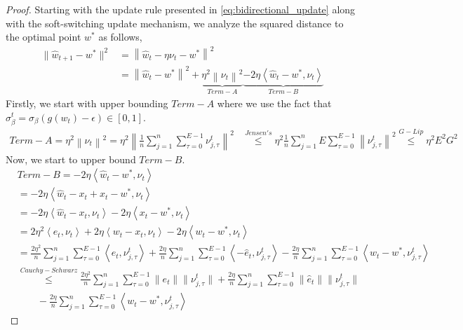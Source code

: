 \documentclass{article} %
\begin{document}
\begin{proof}
    Starting with the update rule presented in \cref{eq:bidirectional_update} along with the soft-switching update mechanism, we analyze the squared distance to the optimal point $w^*$ as follows,
    \begin{align}
    \nonumber
    \|\hat{w}_{t+1} - w^*\|^2 
    &= \left\| \hat{w}_t - \eta \nu_t - w^* \right\|^2 \\
    \label{eq:soft_fedbi_start}
    & = \left\| \hat{w}_t - w^* \right\|^2 + \underbrace{\eta^2\left\|\nu_t \right\|^2}_{Term-A} \underbrace{-2 \eta \left \langle\hat{w}_t - w^*,  \nu_t \right \rangle}_{Term-B}
\end{align}
Firstly, we start with upper bounding $Term-A$ where we use the fact that $\sigma_\beta^t =\sigma_\beta(g(w_t) - \epsilon) \in [0,1]$.
\begin{align*}
    Term-A = \eta^2\left\|\nu_t \right\|^2 = \eta^2 \left\| \frac{1}{n} \sum_{j=1}^n  \sum_{\tau=0}^{E-1} \nu_{j,\tau}^t\right\|^2 &\overset{Jensen's}{\leq} \eta^2 \frac{1}{n} \sum_{j=1}^n E \sum_{\tau=0}^{E-1}\left\|  \nu_{j,\tau}^t\right\|^2 \overset{G-Lip}{\leq} \eta^2 E^2 G^2
\end{align*}
Now, we start to upper bound $Term-B$.
\begin{align*}
    &Term-B = -2 \eta \left \langle\hat{w}_t - w^*,  \nu_t \right \rangle 
    \\
    &= -2 \eta \left \langle\hat{w}_t - x_t + x_t - w^*,  \nu_t \right \rangle
    \\
    & = -2 \eta \left \langle\hat{w}_t - x_t,  \nu_t \right \rangle -2 \eta \left \langle x_t - w^*,  \nu_t \right \rangle 
    \\
    & = 2 \eta^2 \left \langle e_t,  \nu_t \right \rangle + 2 \eta \left \langle w_t - x_t,  \nu_t \right \rangle -2\eta \left \langle w_t - w^*,  \nu_t \right \rangle
    \\
    &= \frac{2 \eta^2 }{n} \sum_{j=1}^n  \sum_{\tau=0}^{E-1} \left \langle e_t,  \nu_{j,\tau}^t  \right \rangle +  \frac{2 \eta}{n} \sum_{j=1}^n  \sum_{\tau=0}^{E-1}\left \langle -\hat{e}_t,  \nu_{j,\tau}^t \right \rangle - \frac{2 \eta}{n} \sum_{j=1}^n  \sum_{\tau=0}^{E-1} \left \langle w_t - w^*,  \nu_{j,\tau}^t \right \rangle
    \\
    &\overset{Cauchy-Schwarz}{\leq}\frac{2 \eta^2 }{n} \sum_{j=1}^n  \sum_{\tau=0}^{E-1}\|e_t\|\|\nu_{j,\tau}^t\| + \frac{2 \eta }{n} \sum_{j=1}^n  \sum_{\tau=0}^{E-1}\|\hat{e}_t\|\|\nu_{j,\tau}^t\| 
    \\
    &\qquad- \frac{2 \eta}{n} \sum_{j=1}^n  \sum_{\tau=0}^{E-1} \left \langle w_t - w^*,  \nu_{j,\tau}^t \right \rangle

\end{align*}
\end{proof}
\end{document}
